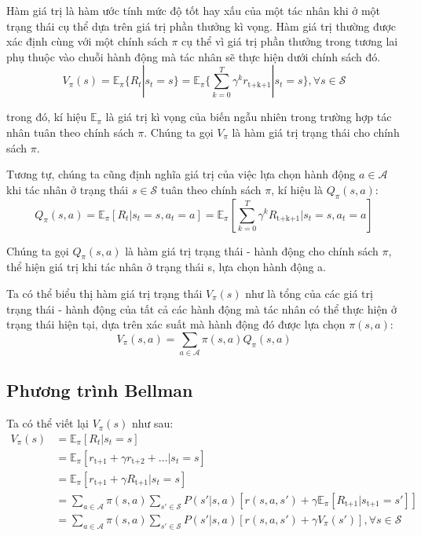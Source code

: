 \documentclass{uetgraduation}
\begin{document}
Hàm giá trị là hàm ước tính mức độ tốt hay xấu của một tác nhân khi ở một trạng thái cụ thể dựa trên giá trị phần thưởng kì vọng. Hàm giá trị thường được xác định cùng với một chính sách $\pi$ cụ thể vì giá trị phần
thưởng trong tương lai phụ thuộc vào chuỗi hành động mà tác nhân sẽ thực hiện dưới chính sách đó.
\begin{equation}
    V_\pi (s) = \mathbb{E}_\pi \{R_t | s_t = s\} = \mathbb{E}_\pi \{\sum_{k=0}^{T} \gamma^k r_\text{t+k+1} | s_t = s\}, \forall s \in \mathcal{S}
\end{equation}

trong đó, kí hiệu $\mathbb{E}_\pi$ là giá trị kì vọng của biến ngẫu nhiên trong trường hợp tác nhân tuân theo chính sách $\pi$. Chúng ta gọi $V_\pi$ là hàm giá trị trạng thái cho chính sách $\pi$.

Tương tự, chúng ta cũng định nghĩa giá trị của việc lựa chọn hành động $a \in \mathcal{A}$ khi tác nhân ở trạng thái $s \in \mathcal{S}$ tuân theo chính sách $\pi$, kí hiệu là $Q_\pi (s, a)$:
\begin{equation}
    Q_\pi (s, a) = \mathbb{E}_\pi [R_t | s_t = s, a_t = a] = \mathbb{E}_\pi [\sum_{k=0}^{T} \gamma^k R_\text{t+k+1} | s_t = s, a_t = a]
\end{equation}

Chúng ta gọi $Q_\pi (s, a)$ là hàm giá trị trạng thái - hành động cho chính sách $\pi$, thể hiện giá trị khi tác nhân ở trạng thái s, lựa chọn hành động a.

Ta có thể biểu thị hàm giá trị trạng thái $V_\pi (s)$ như là tổng của các giá trị trạng thái - hành động của tất cả các hành động mà tác nhân có thể thực hiện ở trạng thái hiện tại, dựa trên xác suất
mà hành động đó được lựa chọn $\pi(s, a)$:
\begin{equation}
    V_\pi (s, a) = \sum_{a \in \mathcal{A}} \pi(s, a) Q_\pi (s, a)
\end{equation}

\subsection{Phương trình Bellman}
Ta có thể viết lại $V_\pi(s)$ như sau:
\begin{equation}
\begin{split}
    V_\pi(s) &= \mathbb{E}_\pi [R_t | s_t = s] \\
    &= \mathbb{E}_\pi [r_\text{t+1} + \gamma r_\text{t+2} + \dots | s_t = s] \\
    &= \mathbb{E}_\pi [r_\text{t+1} + \gamma R_\text{t+1} | s_t = s] \\
    &= \sum_{a \in \mathcal{A}} \pi (s, a) \sum_{s' \in \mathcal{S}} P(s' | s, a) [r(s, a, s') + \gamma \mathbb{E}_\pi [R_\text{t+1} | s_\text{t+1} = s']] \\
    &= \sum_{a \in \mathcal{A}} \pi (s, a) \sum_{s' \in \mathcal{S}} P(s' | s, a) [r(s, a, s') + \gamma V_\pi (s')], \forall s \in \mathcal{S}
\end{split}
\label{eq:v_bellman}
\end{equation}
\end{document}
